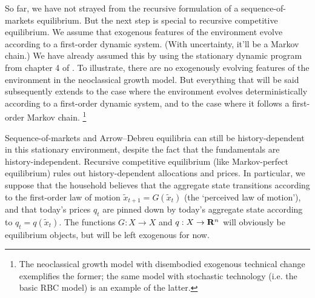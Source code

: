 \documentclass[11pt,letterpaper,reqno,oneside]{article}
\begin{document}
So far, we have not strayed from the recursive formulation of a sequence-of-markets equilibrium. But the next step is special to recursive competitive equilibrium. We assume that exogenous features of the environment evolve according to a first-order dynamic system. (With uncertainty, it'll be a Markov chain.) We have already assumed this by using the stationary dynamic program from chapter 4 of \textcite{StokeyLucasPrescott1989}. To illustrate, there are no exogenously evolving features of the environment in the neoclassical growth model. But everything that will be said subsequently extends to the case where the environment evolves deterministically according to a first-order dynamic system, and to the case where it follows a first-order Markov chain.%
	\footnote{The neoclassical growth model with disembodied exogenous technical change exemplifies the former; the same model with stochastic technology (i.e. the basic RBC model) is an example of the latter.}

Sequence-of-markets and Arrow--Debreu equilibria can still be history-dependent in this stationary environment, despite the fact that the fundamentals are history-independent. Recursive competitive equilibrium (like Markov-perfect equilibrium) rules out history-dependent allocations and prices. In particular, we suppose that the household believes that the aggregate state transitions according to the first-order law of motion $\widetilde{x}_{t+1} = G \left( \widetilde{x}_t \right)$ (the `perceived law of motion'), and that today's prices $q_t$ are pinned down by today's aggregate state according to $q_t = q \left( \widetilde{x}_t \right)$. The functions $G : X \to X$ and $q : X \to \mathbf{R}^n$ will obviously be equilibrium objects, but will be left exogenous for now.
\end{document}
